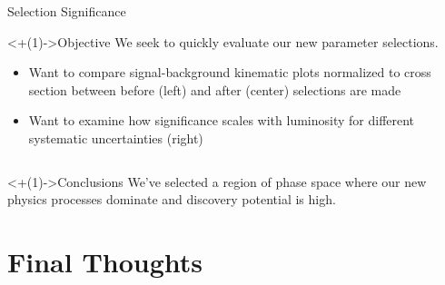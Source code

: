 \documentclass[]{beamer}
\begin{document}
\begin{frame}{Selection Significance}
    \begin{block}<+(1)->{Objective}
        We seek to quickly evaluate our new parameter selections.
        \begin{itemize}[<+(1)->]
            \item Want to compare signal-background kinematic plots normalized to cross section between before (left) and after (center) selections are made
            \item Want to examine how significance scales with luminosity for different systematic uncertainties (right)
        \end{itemize}
    \end{block}
    
    \bigskip
    
    \begin{columns}
    \end{columns}
    \begin{block}<+(1)->{Conclusions}
            We've selected a region of phase space where our new physics processes dominate and discovery potential is high.
    \end{block}
\end{frame}

%
%
\section{Final Thoughts}
\end{document}
